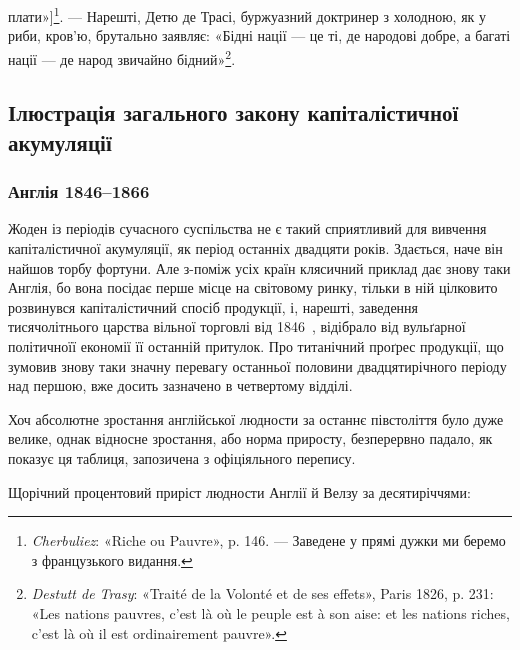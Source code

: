 \parcont{}  %
плати»]\footnote*{
\emph{Cherbuliez}: «Riche ou Pauvre», p. 146. — Заведене у прямі дужки
ми беремо з французького видання. 
}. — Нарешті, Детю де Трасі, буржуазний доктринер з
холодною, як у риби, кров’ю, брутально заявляє: «Бідні нації —
це ті, де народові добре, а багаті нації — де народ звичайно бідний»\footnote{
\emph{Destutt de Trasy}: «Traité de la Volonté et de ses effets», Paris
1826, p. 231: «Les nations pauvres, c’est là où le peuple est à son aise: et
les nations riches, c’est là où il est ordinairement pauvre».
}.

\subsection{Ілюстрація загального закону капіталістичної акумуляції}

\subsubsection{Англія 1846--1866~}

Жоден із періодів сучасного суспільства не є такий сприятливий
для вивчення капіталістичної акумуляції, як період останніх
двадцяти років. Здається, наче він найшов торбу фортуни.
Але з-поміж усіх країн клясичний приклад дає знову таки
Англія, бо вона посідає перше місце на світовому ринку,
тільки в ній цілковито розвинувся капіталістичний спосіб продукції,
і, нарешті, заведення тисячолітнього царства вільної
торговлі від 1846~, відібрало від вульґарної політичноїї економії
її останній притулок. Про титанічний проґрес продукції, що зумовив
знову таки значну перевагу останньої половини двадцятирічного
періоду над першою, вже досить зазначено в четвертому
відділі.

Хоч абсолютне зростання англійської людности за останнє півстоліття
було дуже велике, однак відносне зростання, або норма
приросту, безперервно падало, як показує ця таблиця, запозичена
з офіціяльного перепису.

Щорічний процентовий приріст людности Англії й Велзу
за десятиріччями:

